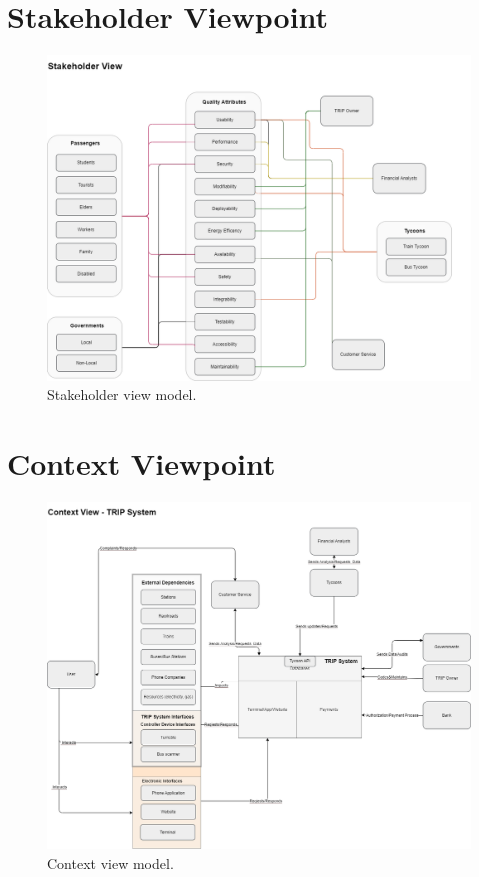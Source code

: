\section{Stakeholder Viewpoint}
\begin{figure}[H]
    \centering
    \includegraphics[width=\textwidth]{drawings/views_final_version/stakeholder_view.png}
    \caption{Stakeholder view model.}
    \label{fig:stakeholder_view_model}
\end{figure}

\section{Context Viewpoint}

\begin{figure}[H]
    \centering
    \includegraphics[width=\textwidth]{drawings/views_final_version/context_view.png}
    \caption{Context view model.}
    \label{fig:context_view_model}
\end{figure}

